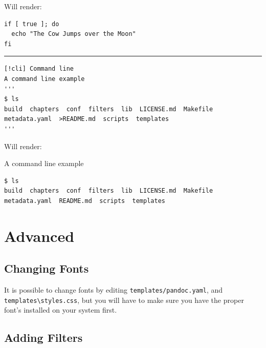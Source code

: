 \documentclass[
  12pt,
  openany]{book}
\begin{document}
Will render:

\begin{codebox}
\begin{verbatim}
if [ true ]; do
  echo "The Cow Jumps over the Moon"
fi
\end{verbatim}

\end{codebox}

\begin{center}\rule{0.5\linewidth}{0.5pt}\end{center}

\begin{codebox}
\begin{verbatim}
[!cli] Command line
A command line example
'''
$ ls
build  chapters  conf  filters  lib  LICENSE.md  Makefile
metadata.yaml  >README.md  scripts  templates
'''
\end{verbatim}

\end{codebox}

Will render:

\begin{clibox}
A command line example

\begin{verbatim}
$ ls
build  chapters  conf  filters  lib  LICENSE.md  Makefile
metadata.yaml  README.md  scripts  templates
\end{verbatim}

\end{clibox}

\section{Advanced}\label{advanced}

\subsection{Changing Fonts}\label{changing-fonts}

It is possible to change fonts by editing
\texttt{templates/pandoc.yaml}, and
\texttt{templates\textbackslash{}styles.css}, but you will have to make
sure you have the proper font's installed on your system first.

\subsection{Adding Filters}\label{adding-filters}
\end{document}
